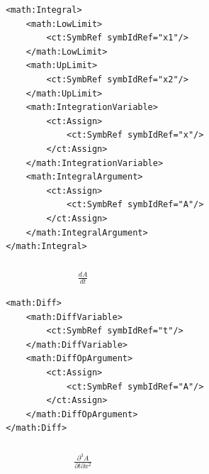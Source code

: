 \lstset{language=XML}
\begin{lstlisting}
                    <math:Integral>
                        <math:LowLimit>
                            <ct:SymbRef symbIdRef="x1"/>
                        </math:LowLimit>
                        <math:UpLimit>
                            <ct:SymbRef symbIdRef="x2"/>
                        </math:UpLimit>
                        <math:IntegrationVariable>
                            <ct:Assign>
                                <ct:SymbRef symbIdRef="x"/>
                            </ct:Assign>
                        </math:IntegrationVariable>
                        <math:IntegralArgument>
                            <ct:Assign>
                                <ct:SymbRef symbIdRef="A"/>
                            </ct:Assign>
                        </math:IntegralArgument>
                    </math:Integral>
\end{lstlisting}


\subsubsection*{}

\begin{align}
\frac{dA}{dt} \nonumber 
\end{align}

\lstset{language=XML}
\begin{lstlisting}
                    <math:Diff>
                        <math:DiffVariable>
                            <ct:SymbRef symbIdRef="t"/>
                        </math:DiffVariable>
                        <math:DiffOpArgument>
                            <ct:Assign>
                                <ct:SymbRef symbIdRef="A"/>
                            </ct:Assign>
                        </math:DiffOpArgument>
                    </math:Diff>
\end{lstlisting}

\subsubsection*{}

\begin{align}
\frac{\partial^3 A}{\partial t\partial x^2} \nonumber 
\end{align}

